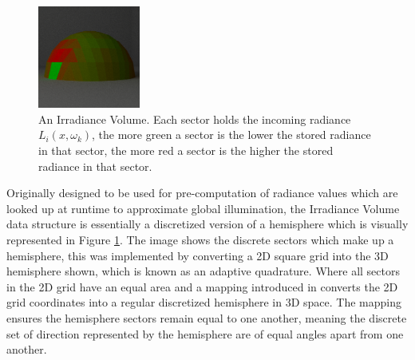 \documentclass[../dissertation.tex]{subfiles}
\begin{document}
\begin{figure}[h]
\begin{center}
\includegraphics[width=0.3\textwidth]{images/renders/hemispheres/irradiance_volume.png}    
\end{center}
\caption{An Irradiance Volume. Each sector holds the incoming radiance $L_i(x,\omega_k)$, the more green a sector is the lower the stored radiance in that sector, the more red a sector is the higher the stored radiance in that sector. }
\label{fig:irradiance_volume}
\end{figure}

Originally designed to be used for pre-computation of radiance values which are looked up at runtime to approximate global illumination, the Irradiance Volume data structure is essentially a discretized version of a hemisphere which is visually represented in Figure \ref{fig:irradiance_volume}. The image shows the discrete sectors which make up a hemisphere, this was implemented by converting a 2D square grid into the 3D hemisphere shown, which is known as an adaptive quadrature. Where all sectors in the 2D grid have an equal area and a mapping introduced in \cite{shirley1994notes} converts the 2D grid coordinates into a regular discretized hemisphere in 3D space. The mapping ensures the hemisphere sectors remain equal to one another, meaning the discrete set of direction represented by the hemisphere are of equal angles apart from one another.\\
\end{document}

